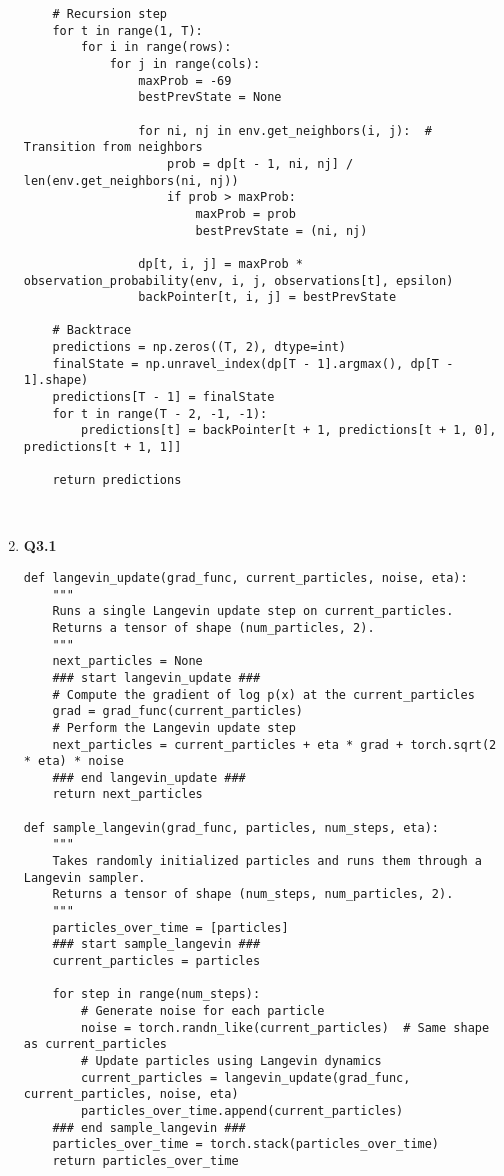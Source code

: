 \documentclass{article}
\begin{document}
\begin{enumerate}
\begin{verbatim}
    # Recursion step
    for t in range(1, T):
        for i in range(rows):
            for j in range(cols):
                maxProb = -69
                bestPrevState = None

                for ni, nj in env.get_neighbors(i, j):  # Transition from neighbors
                    prob = dp[t - 1, ni, nj] / len(env.get_neighbors(ni, nj))
                    if prob > maxProb:
                        maxProb = prob
                        bestPrevState = (ni, nj)

                dp[t, i, j] = maxProb * observation_probability(env, i, j, observations[t], epsilon)
                backPointer[t, i, j] = bestPrevState

    # Backtrace
    predictions = np.zeros((T, 2), dtype=int)
    finalState = np.unravel_index(dp[T - 1].argmax(), dp[T - 1].shape)
    predictions[T - 1] = finalState
    for t in range(T - 2, -1, -1):
        predictions[t] = backPointer[t + 1, predictions[t + 1, 0], predictions[t + 1, 1]]

    return predictions
    


    \end{verbatim}\newpage
    
     \item 
    \textbf{Q3.1}
    \begin{verbatim}
def langevin_update(grad_func, current_particles, noise, eta):
    """
    Runs a single Langevin update step on current_particles.
    Returns a tensor of shape (num_particles, 2).
    """
    next_particles = None
    ### start langevin_update ###
    # Compute the gradient of log p(x) at the current_particles
    grad = grad_func(current_particles)
    # Perform the Langevin update step
    next_particles = current_particles + eta * grad + torch.sqrt(2 * eta) * noise
    ### end langevin_update ###
    return next_particles

def sample_langevin(grad_func, particles, num_steps, eta):
    """
    Takes randomly initialized particles and runs them through a Langevin sampler.
    Returns a tensor of shape (num_steps, num_particles, 2).
    """
    particles_over_time = [particles]
    ### start sample_langevin ###
    current_particles = particles

    for step in range(num_steps):
        # Generate noise for each particle
        noise = torch.randn_like(current_particles)  # Same shape as current_particles
        # Update particles using Langevin dynamics
        current_particles = langevin_update(grad_func, current_particles, noise, eta)
        particles_over_time.append(current_particles)
    ### end sample_langevin ###
    particles_over_time = torch.stack(particles_over_time)
    return particles_over_time
    \end{verbatim}\newpage
    
    
\end{enumerate}
\end{document}
